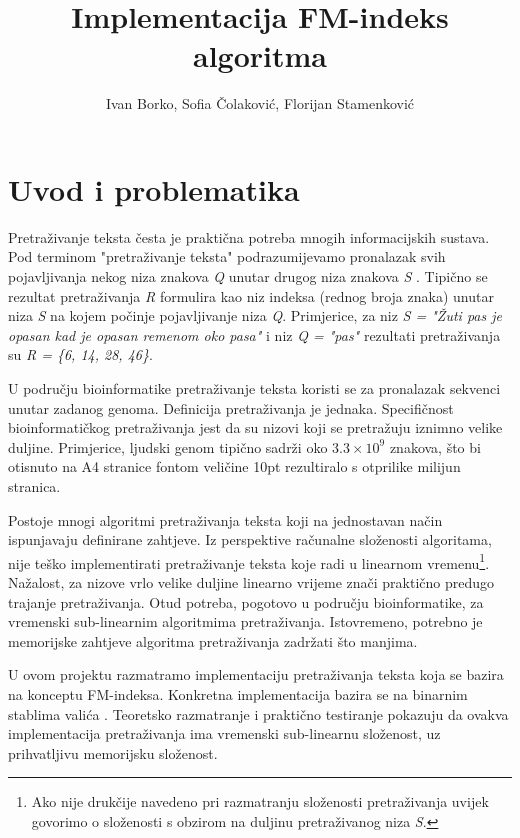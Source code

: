 \documentclass[times, utf8, seminar, numeric]{fer}
\title{Implementacija FM-indeks algoritma}
\author{Ivan Borko, Sofia Čolaković, Florijan Stamenković}
\begin{document}
\maketitle

\tableofcontents

\chapter{Uvod i problematika}

Pretraživanje teksta česta je praktična potreba mnogih informacijskih sustava.
Pod terminom "pretraživanje teksta" podrazumijevamo pronalazak svih pojavljivanja
nekog niza znakova \textit{Q}  unutar drugog niza znakova \textit{S} .
Tipično se rezultat pretraživanja \textit{R}
formulira kao niz indeksa (rednog broja znaka) unutar niza \textit{S} na kojem počinje pojavljivanje
niza \textit{Q}. Primjerice, za niz \textit{S = "Žuti pas je opasan kad je opasan remenom oko pasa"}
i niz \textit{Q = "pas"} rezultati
pretraživanja su \textit{R = \{6, 14, 28, 46\}}.

U području bioinformatike pretraživanje teksta koristi se za pronalazak
sekvenci unutar zadanog genoma. Definicija pretraživanja je jednaka. Specifičnost
bioinformatičkog pretraživanja jest da su nizovi koji se pretražuju iznimno velike duljine.
Primjerice, ljudski genom tipično sadrži oko $3.3 \times 10^9$ znakova, što bi otisnuto na
A4 stranice fontom veličine 10pt rezultiralo s otprilike milijun stranica.

Postoje mnogi algoritmi pretraživanja teksta
koji na jednostavan način ispunjavaju definirane zahtjeve.
Iz perspektive računalne složenosti algoritama, nije teško implementirati pretraživanje
teksta koje radi u linearnom vremenu\footnote{Ako nije drukčije navedeno pri razmatranju složenosti pretraživanja
uvijek govorimo o složenosti s obzirom na duljinu pretraživanog niza \textit{S}.}.
Nažalost, za nizove vrlo velike duljine linearno vrijeme
znači praktično predugo trajanje pretraživanja. Otud potreba, pogotovo u području bioinformatike,
za vremenski sub-linearnim algoritmima pretraživanja. Istovremeno, potrebno je memorijske
zahtjeve algoritma pretraživanja zadržati što manjima.

U ovom projektu razmatramo implementaciju pretraživanja teksta koja se bazira na konceptu
FM-indeksa. Konkretna implementacija bazira se na binarnim stablima valića .
Teoretsko razmatranje i praktično testiranje pokazuju da ovakva implementacija pretraživanja
ima vremenski sub-linearnu složenost, uz prihvatljivu memorijsku složenost.
\end{document}
